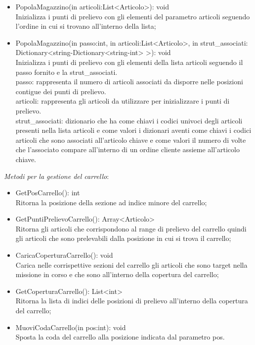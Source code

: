\begin{itemize}
    \item PopolaMagazzino(in articoli:List<Articolo>): void\\
    Inizializza i punti di prelievo con gli elementi del parametro articoli seguendo l'ordine in cui si trovano all'interno della lista;
    \item PopolaMagazzino(in passo:int, in articoli:List<Articolo>, in strut\_associati: Dictionary<string-Dictionary<string-int> >): void\\
    Inizializza i punti di prelievo con gli elementi della lista articoli seguendo il passo fornito e la strut\_associati.\\
    passo: rappresenta il numero di articoli associati da disporre nelle posizioni contigue dei punti di prelievo.\\
    articoli: rappresenta gli articoli da utilizzare per inizializzare i punti di prelievo.\\
    strut\_associati: dizionario che ha come chiavi i codici univoci degli articoli presenti nella lista articoli e come valori i dizionari aventi come chiavi 
    i codici articoli che sono associati all'articolo chiave e come valori il numero di volte che l'associato compare all'interno di un ordine cliente assieme all'articolo chiave.\\
\end{itemize}
\textit{Metodi per la gestione del carrello}:
\begin{itemize}
    \item GetPosCarrello(): int\\
    Ritorna la posizione della sezione ad indice minore del carrello;
    \item GetPuntiPrelievoCarrello(): Array<Articolo>\\
    Ritorna gli articoli che corrispondono al range di prelievo del carrello quindi gli articoli che sono prelevabili dalla posizione in cui si trova il carrello;
    \item CaricaCoperturaCarrello(): void\\
    Carica nelle corrispettive sezioni del carrello gli articoli che sono target nella missione in corso e che sono all'interno della copertura del carrello;
    \item GetCoperturaCarrello(): List<int>\\
    Ritorna la lista di indici delle posizioni di prelievo all'interno della copertura del carrello;
    \item MuoviCodaCarrello(in pos:int): void\\
    Sposta la coda del carrello alla posizione indicata dal parametro pos.\\
\end{itemize}
